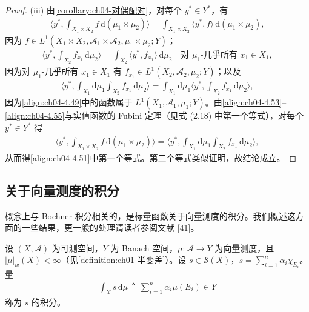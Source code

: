 \documentclass[../../main.tex]{subfiles}%
\begin{document}
\begin{proof}
(iii) 由\cref{corollary:ch04-对偶配对}，对每个 $y^*\in Y^*$，有
\begin{align}
\Big\langle y^*,\int_{X_1\times X_2}f\,\mathrm{d}(\mu_1\times\mu_2)\Big\rangle=\int_{X_1\times X_2}\langle y^*,f\rangle\,\mathrm{d}(\mu_1\times\mu_2), \label{align:ch04-4.53}
\end{align}
因为 $f\in L^1(X_1\times X_2,\mathcal{A}_1\times\mathcal{A}_2,\mu_1\times\mu_2;Y)$；
\begin{align}
\Big\langle y^*,\int_{X_2}f_{x_1}\,\mathrm{d}\mu_2\Big\rangle=\int_{X_2}\langle y^*,f_{x_1}\rangle\,\mathrm{d}\mu_2\quad\text{对 }\mu_1\text{-几乎所有 }x_1\in X_1, \label{align:ch04-4.54}
\end{align}
因为对 $\mu_1$-几乎所有 $x_1\in X_1$ 有 $f_{x_1}\in L^1(X_2,\mathcal{A}_2,\mu_2;Y)$；以及
\begin{align}
\Big\langle y^*,\int_{X_1}\mathrm{d}\mu_1\int_{X_2}f_{x_1}\,\mathrm{d}\mu_2\Big\rangle=\int_{X_1}\mathrm{d}\mu_1\Big\langle y^*,\int_{X_2}f_{x_1}\,\mathrm{d}\mu_2\Big\rangle, \label{align:ch04-4.55}
\end{align}
因为\eqref{align:ch04-4.49}中的函数属于 $L^1(X_1,\mathcal{A}_1,\mu_1;Y)$。由\eqref{align:ch04-4.53}--\eqref{align:ch04-4.55}与实值函数的 Fubini 定理（见式 (2.18) 中第一个等式），对每个 $y^*\in Y^*$ 得
\begin{align*}
\Big\langle y^*,\int_{X_1\times X_2}f\,\mathrm{d}(\mu_1\times\mu_2)\Big\rangle=\Big\langle y^*,\int_{X_1}\mathrm{d}\mu_1\int_{X_2}f_{x_1}\,\mathrm{d}\mu_2\Big\rangle,
\end{align*}
从而得\eqref{align:ch04-4.51}中第一个等式。第二个等式类似证明，故结论成立。
\end{proof}

\subsection{关于向量测度的积分}\label{subsection:ch04-向量测度积分}\label{subsection:ch04-带号测度积分}

概念上与 Bochner 积分相关的，是标量函数关于向量测度的积分。我们概述这方面的一些结果，更一般的处理请读者参阅文献 [41]。

设 $(X,\mathcal{A})$ 为可测空间，$Y$ 为 Banach 空间，$\mu:\mathcal{A}\to Y$ 为向量测度，且 $|\mu|_w(X)<\infty$（见\cref{definition:ch01-半变差}）。设 $s\in\mathcal{S}(X)$，$s=\sum_{i=1}^n\alpha_i\chi_{E_i}$。量
\begin{align}
\int_X s\,\mathrm{d}\mu\triangleq \sum_{i=1}^n\alpha_i\mu(E_i)\in Y \label{align:ch04-4.56}
\end{align}
称为 $s$ 的积分。
\end{document}
